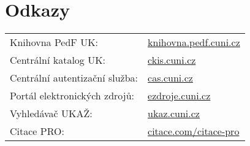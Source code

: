 \section{Odkazy}

\footnotesize
\begin{tabular}{@{}ll@{}}
  Knihovna PedF UK:& \url{knihovna.pedf.cuni.cz} \\

  Centrální katalog UK:& \url{ckis.cuni.cz} \\

  Centrální autentizační služba:& \url{cas.cuni.cz}\\

  Portál elektronických zdrojů:& \url{ezdroje.cuni.cz}\\

  Vyhledávač UKAŽ:& \url{ukaz.cuni.cz} \\

  Citace PRO: & \url{citace.com/citace-pro} \\


\end{tabular}

